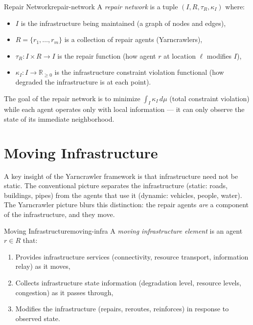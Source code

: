 \begin{definition}{Repair Network}{repair-network}
  A \emph{repair network} is a tuple $(I, R, \tau_R, \kappa_I)$ where:
  \begin{itemize}
    \item $I$ is the infrastructure being maintained (a graph of
          nodes and edges),
    \item $R = \{r_1, \ldots, r_m\}$ is a collection of repair
          agents (Yarncrawlers),
    \item $\tau_R : I \times R \to I$ is the repair function
          (how agent $r$ at location $\ell$ modifies $I$),
    \item $\kappa_I : I \to \mathbb{R}_{\geq 0}$ is the
          infrastructure constraint violation functional (how
          degraded the infrastructure is at each point).
  \end{itemize}
\end{definition}

The goal of the repair network is to minimize $\int_I \kappa_I\,d\mu$
(total constraint violation) while each agent operates only with local
information — it can only observe the state of its immediate neighborhood.

\section{Moving Infrastructure}

A key insight of the Yarncrawler framework is that infrastructure need
not be static. The conventional picture separates the infrastructure
(static: roads, buildings, pipes) from the agents that use it (dynamic:
vehicles, people, water). The Yarncrawler picture blurs this distinction:
the repair agents \emph{are} a component of the infrastructure, and they
move.

\begin{definition}{Moving Infrastructure}{moving-infra}
  A \emph{moving infrastructure element} is an agent $r \in R$ that:
  \begin{enumerate}
    \item Provides infrastructure services (connectivity, resource
          transport, information relay) as it moves,
    \item Collects infrastructure state information (degradation level,
          resource levels, congestion) as it passes through,
    \item Modifies the infrastructure (repairs, reroutes, reinforces)
          in response to observed state.
  \end{enumerate}
\end{definition}

